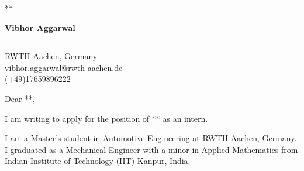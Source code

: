 \documentclass{letter} %
\date{** September, 2019 } %
\begin{document}
\signature{Vibhor Aggarwal}           %
\longindentation=0pt                       %
\let\raggedleft\raggedright                %
 
 
\begin{letter}
{**}
\begin{center}
{\large\bf Vibhor Aggarwal} 
\end{center}
\medskip\hrule height 1pt
\begin{center}
{RWTH Aachen, Germany  \\  vibhor.aggarwal@rwth-aachen.de \\ (+49)17659896222 } 
\end{center} \vfill %
 
 
\opening{Dear **,} 
I am writing to apply for the position of ** as an intern. 

I am a Master's student in Automotive Engineering at RWTH Aachen, Germany. I graduated as a Mechanical Engineer with a minor in Applied Mathematics from Indian Institute of Technology (IIT) Kanpur, India.


\end{letter}
\end{document}
